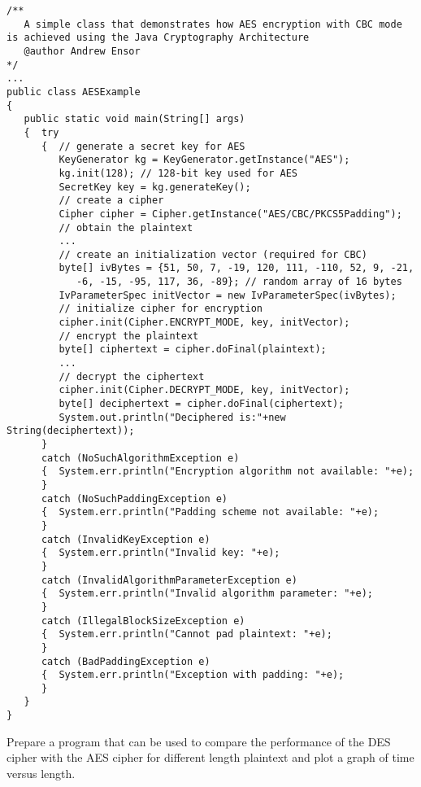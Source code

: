 \begin{lstlisting}[caption=AES encryption with CBC mode]
/**
   A simple class that demonstrates how AES encryption with CBC mode is achieved using the Java Cryptography Architecture
   @author Andrew Ensor
*/
...
public class AESExample
{
   public static void main(String[] args)
   {  try
      {  // generate a secret key for AES
         KeyGenerator kg = KeyGenerator.getInstance("AES");
         kg.init(128); // 128-bit key used for AES
         SecretKey key = kg.generateKey();
         // create a cipher
         Cipher cipher = Cipher.getInstance("AES/CBC/PKCS5Padding");
         // obtain the plaintext
         ...
         // create an initialization vector (required for CBC)
         byte[] ivBytes = {51, 50, 7, -19, 120, 111, -110, 52, 9, -21,
            -6, -15, -95, 117, 36, -89}; // random array of 16 bytes
         IvParameterSpec initVector = new IvParameterSpec(ivBytes);
         // initialize cipher for encryption
         cipher.init(Cipher.ENCRYPT_MODE, key, initVector);
         // encrypt the plaintext
         byte[] ciphertext = cipher.doFinal(plaintext);
         ...
         // decrypt the ciphertext
         cipher.init(Cipher.DECRYPT_MODE, key, initVector);
         byte[] deciphertext = cipher.doFinal(ciphertext);
         System.out.println("Deciphered is:"+new String(deciphertext));
      }
      catch (NoSuchAlgorithmException e)
      {  System.err.println("Encryption algorithm not available: "+e);
      }
      catch (NoSuchPaddingException e)
      {  System.err.println("Padding scheme not available: "+e);
      }
      catch (InvalidKeyException e)
      {  System.err.println("Invalid key: "+e);
      }
      catch (InvalidAlgorithmParameterException e)
      {  System.err.println("Invalid algorithm parameter: "+e);
      }
      catch (IllegalBlockSizeException e)
      {  System.err.println("Cannot pad plaintext: "+e);
      }
      catch (BadPaddingException e)
      {  System.err.println("Exception with padding: "+e);
      }
   }
}
\end{lstlisting}


\begin{exercise}
Prepare a program that can be used to compare the performance of the DES cipher
with the AES cipher for different length plaintext and plot a graph of
time versus length.
\end{exercise}



